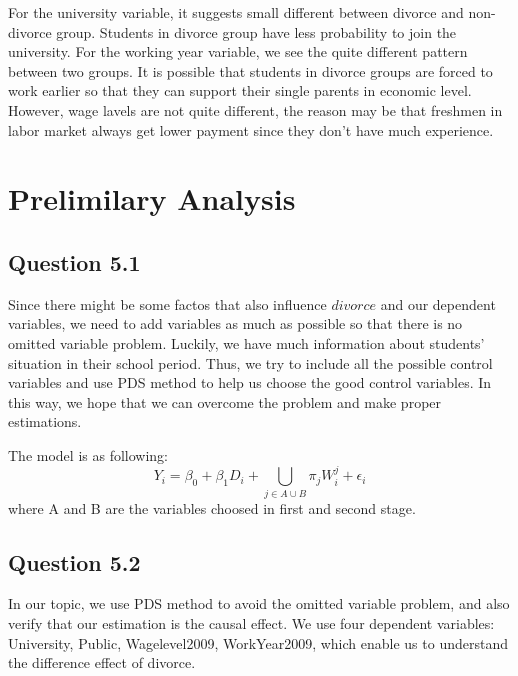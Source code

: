\documentclass[11pt, letterpaper]{article}
\begin{document}
For the university variable, it suggests small different between divorce and non-divorce group. Students in divorce group have less probability to join the university.
For the working year variable, we see the quite different pattern between two groups. It is possible that students in divorce groups are forced to work earlier so that they can support their single parents in economic level.
However, wage lavels are not quite different, the reason may be that freshmen in labor market always get lower payment since they don't have much experience.

\section{Prelimilary Analysis}

\subsection*{Question 5.1}

Since there might be some factos that also influence $\textit{divorce}$ and our dependent variables, we need to add variables as much as possible so that there is no omitted variable problem.
Luckily, we have much information about students' situation in their school period. Thus, we try to include all the possible control variables and use PDS method to help us choose the good control variables.
In this way, we hope that we can overcome the problem and make proper estimations.

The model is as following:
\[
Y_i = \beta_0 + \beta_1 D_i + \bigcup_{j \in A \cup B} \pi_j W_i^j + \epsilon_i
\]
where A and B are the variables choosed in first and second stage.


\subsection*{Question 5.2}

In our topic, we use PDS method to avoid the omitted variable problem, and also verify that our estimation is the causal effect.
We use four dependent variables: University, Public, Wagelevel2009, WorkYear2009, which enable us to understand the difference effect of divorce. 
\end{document}
